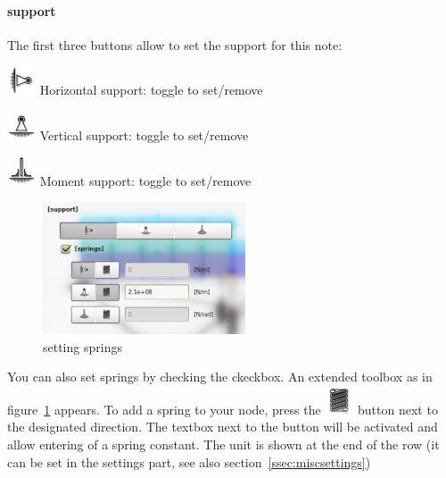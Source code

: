 \documentclass[a4paper,11pt]{report}
\begin{document}
\paragraph{support}
The first three buttons allow to set the support for this note:
\begin{trivlist}
	\leftskip=1cm
	\item[]\includegraphics[scale = 0.5]{../../icons/bearingH.png} Horizontal support: toggle to set/remove
	\item[]\includegraphics[scale = 0.5]{../../icons/bearingV.png} Vertical support: toggle to set/remove
	\item[]\includegraphics[scale = 0.5]{../../icons/bearingM.png} Moment support: toggle to set/remove
\end{trivlist}





\begin{minipage}[h]{6.5cm}
\begin{figure}[H]
\begin{center}
\includegraphics[width=6cm]{../pictures/supportextended.png}
\caption{setting springs}
\label{pic:supportextended}
\end{center}
\end{figure}
\end{minipage}
\begin{minipage}[h]{\textwidth-7cm}
You can also set springs by checking the  ckeckbox. An extended toolbox as in figure~\ref{pic:supportextended} appears. To add a spring to your node, press the \includegraphics[scale=0.5]{../../icons/spring.png} button next to the designated direction. The textbox next to the button will be activated and allow entering of a spring constant. The unit is shown at the end of the row (it can be set in the settings part, see also section~\ref{ssec:miscsettings}) 
\end{minipage}
\end{document}
